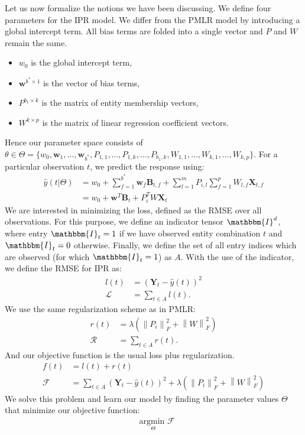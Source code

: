 \documentclass[10pt]{proc}
\newcommand{\norm}[1]{\left\lVert#1\right\rVert}
\newcommand{\elips}[1]{\ldots#1\allowbreak}
\newcommand{\bc}{,\allowbreak}
\begin{document}
Let us now formalize the notions we have been discussing. We define four
parameters for the IPR model. We differ from the PMLR model by introducing a
global intercept term. All bias terms are folded into a single vector and $P$
and $W$ remain the same.
%
\begin{itemize}
    \item  $w_0$ is the global intercept term,
    \item  $\bm{w}^{b^* \times 1}$ is the vector of bias terms,
    \item  $P^{b_1 \times k}$ is the matrix of entity membership vectors,
    \item  $W^{k \times p}$ is the matrix of linear regression coefficient vectors.
\end{itemize}
%
Hence our parameter space consists of $\mathrel{\theta \in \Theta = \{}w_0\bc
\bm{w}_1\bc \elips{,} \bm{w}_{b^*}\bc P_{1,1}\bc \elips{,} P_{1,k}\bc \elips{,}
P_{b_1,k}\bc W_{1,1}\bc \elips{,} W_{k,1}\bc \elips{,} W_{k,p}\}$.  For a particular
observation $t$, we predict the response using:
%
\begin{align}
    \hat{y}(t | \Theta)
        &= w_0 + \sum_{f=1}^{b^*} \bm{w}_f \bm{B}_{t,f} +
           \sum_{l=1}^m P_{i,l} \sum_{f=1}^p W_{l,f} \bm{X}_{t,f}  \\
        &= w_0 + \bm{w}^T \bm{B}_t + P_i^T W \bm{X}_t
\end{align}
%
We are interested in minimizing the loss, defined as the RMSE over all
observations. For this purpose, we define an indicator tensor $\mathbbm{I}^d$,
where entry $\mathbbm{I}_t = 1$ if we have observed entity combination $t$ and
$\mathbbm{I}_t = 0$ otherwise. Finally, we define the set of all entry indices
which are observed (for which $\mathbbm{I}_t = 1$) as $A$. With the use of the
indicator, we define the RMSE for IPR as:
%
\begin{align}
    l(t) &= (\bm{Y}_t - \hat{y}(t))^2  \\
    \mathcal{L} &= \sum_{t \in A} l(t).
\end{align}
%
We use the same regularization scheme as in PMLR:
%
\begin{align}
    r(t) &= \lambda (\norm{P_i}_F^2 + \norm{W}_F^2)  \\
    \mathcal{R} &= \sum_{t \in A} r(t).
\end{align}
%
And our objective function is the usual loss plus regularization.
%
\begin{align}
    f(t) &= l(t) + r(t)  \\
    \mathcal{F} &= \sum_{t \in A}  \label{eq:ipr-opt}
        (\bm{Y}_t - \hat{y}(t))^2 + \lambda (\norm{P_i}_F^2 + \norm{W}_F^2)
\end{align}
%
We solve this problem and learn our model by finding the parameter values
$\Theta$ that minimize our objective function:
%
\begin{align}
    &\underset{\Theta}{\text{argmin }} \mathcal{F}  \label{eq:obj}
\end{align}
\end{document}
